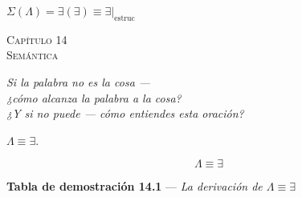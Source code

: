 \documentclass[10pt, openany, oneside]{book}
\renewcommand{\large}{\fontsize{11.5}{14}\selectfont}
\renewcommand{\huge}{\fontsize{17}{21}\selectfont}
\begin{document}
\vspace{0.5em}

\begin{center}
    $\Sigma(\Lambda) = \exists(\exists) \equiv \exists|_{\text{estruc}}$
\end{center}

%
%
%
%

\newpage

\begin{center}
    {\huge\scshape Capítulo 14}\\[0.3em]
    {\large\scshape Semántica}
\end{center}

\vspace{1.5em}

\begin{center}
    \itshape
    Si la palabra no es la cosa ---\\
    ¿cómo alcanza la palabra a la cosa?\\
    ¿Y si no puede --- cómo entiendes esta oración?
\end{center}

\vspace{2em}


\noindent $\Lambda \equiv \exists$.

$$\boxed{\Lambda \equiv \exists}$$

\vspace{0.5em}

\textbf{Tabla de demostración 14.1} --- \textit{La derivación de $\Lambda \equiv \exists$}

\vspace{0.5em}
\end{document}
